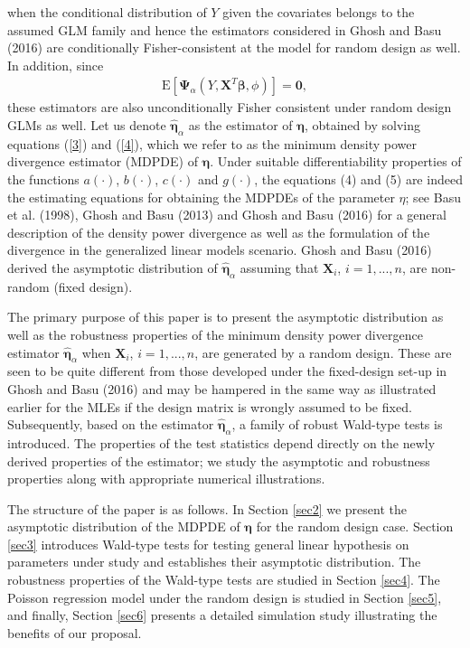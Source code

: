 \documentclass[a4paper]{article}%
\begin{document}
when the conditional distribution of $Y$ given the covariates belongs to the assumed GLM family
and hence the estimators considered in Ghosh and Basu (2016) are conditionally Fisher-consistent
at the model for random design as well. 
In addition, since%
\begin{align}
\mathrm{E}\left[  \boldsymbol{\Psi}_{\alpha}(Y,\boldsymbol{X}^{T}%
\boldsymbol{\beta},\phi)\right]  =\boldsymbol{0}, \label{EQ:func_est}%
\end{align}
these estimators are also unconditionally  Fisher consistent under random design GLMs as well.
Let us denote $\widehat{\boldsymbol{\eta}}_{\alpha}$ as the estimator of $\boldsymbol{\eta}$, 
obtained by solving  equations (\ref{3}) and (\ref{4}),
which we refer to as the minimum density power divergence estimator (MDPDE) of $\boldsymbol{\eta}$. 
Under suitable differentiability properties of the functions $a(\cdot)$, $b(\cdot)$, $c(\cdot)$ and $g(\cdot)$, 
the equations (4) and (5) are indeed the estimating equations for obtaining the MDPDEs  of the parameter $\eta$; 
see Basu et al. (1998), Ghosh and Basu (2013) and Ghosh and Basu (2016) for a general description of the density power divergence as well as the formulation of the divergence in the generalized linear models scenario.  
Ghosh and Basu (2016) derived the asymptotic distribution of  $\widehat{\boldsymbol{\eta}}_{\alpha}$ assuming that
$\boldsymbol{X}_{i}$, $i=1,...,n$, are non-random (fixed design). 

The primary purpose of this paper is to present the
asymptotic distribution as well as the robustness properties of the minimum density power divergence estimator 
$\widehat{\boldsymbol{\eta}}_{\alpha}$ when $\boldsymbol{X}_{i}$, $i=1,...,n$, are generated by  a random design. 
These are seen to be quite different from those developed under the fixed-design set-up in Ghosh and Basu (2016)
and may be hampered in the same way as illustrated earlier for the MLEs if the design matrix is wrongly assumed to be fixed.
Subsequently,  based on the estimator $\widehat{\boldsymbol{\eta}}_{\alpha}$, 
a family of robust Wald-type tests is introduced.
The properties of the test statistics depend directly on the newly derived properties of the estimator;
we study the asymptotic and robustness properties 
along with appropriate numerical illustrations.


The structure of the paper is as follows. In
Section \ref{sec2} we present the asymptotic distribution of the MDPDE of
$\boldsymbol{\eta}$ for the random design case. Section \ref{sec3} 
introduces Wald-type tests for testing general linear hypothesis on parameters
under study and establishes their asymptotic distribution. The robustness
properties of the Wald-type tests are
studied in Section \ref{sec4}. The Poisson regression model under the random
design is studied in Section \ref{sec5},  and finally, Section \ref{sec6} presents a detailed simulation study illustrating the benefits  of our proposal.
\end{document}
